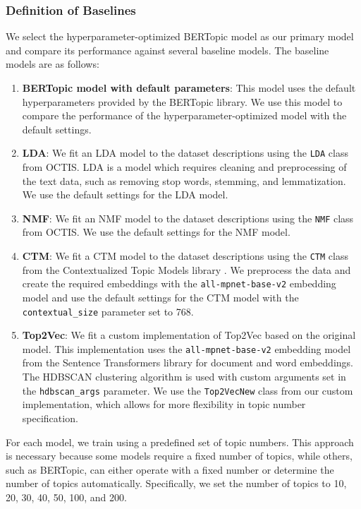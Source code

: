\subsubsection{Definition of Baselines}
We select the hyperparameter-optimized BERTopic model as our primary model and compare its performance against several baseline models. The baseline models are as follows:
\begin{enumerate}
    \item \textbf{BERTopic model with default parameters}: This model uses the default hyperparameters provided by the BERTopic library. We use this model to compare the performance of the hyperparameter-optimized model with the default settings.
    \item \textbf{LDA}: We fit an LDA model to the dataset descriptions using the \texttt{LDA} class from OCTIS. LDA is a model which requires cleaning and preprocessing of the text data, such as removing stop words, stemming, and lemmatization. We use the default settings for the LDA model.
    \item \textbf{NMF}: We fit an NMF model to the dataset descriptions using the \texttt{NMF} class from OCTIS. We use the default settings for the NMF model.
    \item \textbf{CTM}: We fit a CTM model to the dataset descriptions using the \texttt{CTM} class from the Contextualized Topic Models library \cite{noauthor_milanlproccontextualized-topic-models_2024}. We preprocess the data and create the required embeddings with the \texttt{all-mpnet-base-v2} embedding model and use the default settings for the CTM model with the \texttt{contextual\_size} parameter set to 768.
    \item \textbf{Top2Vec}: We fit a custom implementation of Top2Vec based on the original model. This implementation uses the \texttt{all-mpnet-base-v2} embedding model from the Sentence Transformers library for document and word embeddings. The HDBSCAN clustering algorithm is used with custom arguments set in the \texttt{hdbscan\_args} parameter. We use the \texttt{Top2VecNew} class from our custom implementation, which allows for more flexibility in topic number specification.
\end{enumerate}

For each model, we train using a predefined set of topic numbers. This approach is necessary because some models require a fixed number of topics, while others, such as BERTopic, can either operate with a fixed number or determine the number of topics automatically. Specifically, we set the number of topics to 10, 20, 30, 40, 50, 100, and 200.

